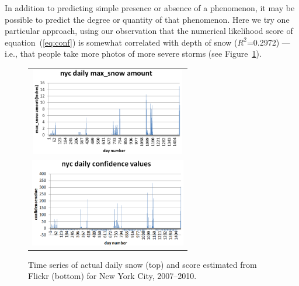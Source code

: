 In addition to predicting simple presence or absence of a phenomenon, it may be possible to predict the degree or quantity of that phenomenon. Here we try one particular approach, 
using our observation that the 
numerical likelihood score of equation~(\ref{eq:conf}) is somewhat correlated with depth of snow 
($R^2$=0.2972) --- i.e., that people take more photos of more severe storms (see Figure~\ref{fig:nyc_daily_conf_maxsnow}).
%
%
%
\begin{figure}
\begin{tabular}{c}
\hspace{0.05in}\includegraphics[width=2.66in,clip,trim=0 0.78in 0 0.5in]{plots/nyc_daily_maxsnow.png} \\
\includegraphics[width=2.7in,clip,trim=0 0 0 0.5in]{plots/nyc_daily_confidence.png} 
\end{tabular}
\vspace{-12pt}
\caption{Time series of actual daily snow  (top) and score estimated from Flickr  (bottom) for New York City, 2007--2010.}
\label{fig:nyc_daily_conf_maxsnow}
\end{figure}
